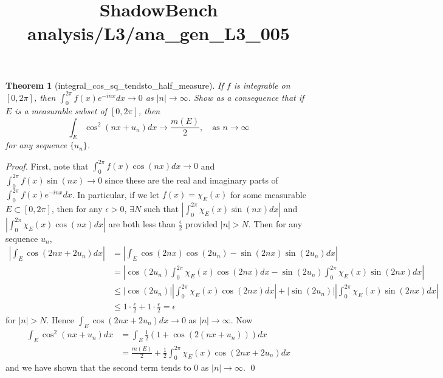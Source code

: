 \documentclass{article}
\title{ShadowBench analysis/L3/ana\_gen\_L3\_005}
\newtheorem{theorem}{Theorem}
\begin{document}
\maketitle

\begin{theorem}[integral_cos_sq_tendsto_half_measure]
If $f$ is integrable on $[0, 2\pi]$, then $\int_0^{2\pi} f(x) e^{-inx} dx \to 0$ as $|n| \to \infty$. Show as a consequence that if $E$ is a measurable subset of $[0, 2\pi]$, then
\[ \int_E \cos^2(nx + u_n) dx \to \frac{m(E)}{2}, \quad \text{as } n \to \infty \]
for any sequence $\{u_n\}$.
\end{theorem}

\begin{proof}
First, note that $\int_0^{2\pi} f(x) \cos(nx) dx \to 0$ and $\int_0^{2\pi} f(x) \sin(nx) \to 0$ since these are the real and imaginary parts of $\int_0^{2\pi} f(x) e^{-inx} dx$. In particular, if we let $f(x) = \chi_E(x)$ for some measurable $E \subset [0, 2\pi]$, then for any $\epsilon > 0$, $\exists N$ such that $\left| \int_0^{2\pi} \chi_E(x) \sin(nx) dx \right|$ and $\left| \int_0^{2\pi} \chi_E(x) \cos(nx) dx \right|$ are both less than $\frac{\epsilon}{2}$ provided $|n| > N$. Then for any sequence $u_n$,
\begin{align*}
\left| \int_E \cos(2nx + 2u_n) dx \right| &= \left| \int_E \cos(2nx) \cos(2u_n) - \sin(2nx) \sin(2u_n) dx \right| \\
&= \left| \cos(2u_n) \int_0^{2\pi} \chi_E(x) \cos(2nx) dx - \sin(2u_n) \int_0^{2\pi} \chi_E(x) \sin(2nx) dx \right| \\
&\le |\cos(2u_n)| \left| \int_0^{2\pi} \chi_E(x) \cos(2nx) dx \right| + |\sin(2u_n)| \left| \int_0^{2\pi} \chi_E(x) \sin(2nx) dx \right| \\
&\le 1 \cdot \frac{\epsilon}{2} + 1 \cdot \frac{\epsilon}{2} = \epsilon
\end{align*}
for $|n| > N$. Hence $\int_E \cos(2nx + 2u_n) dx \to 0$ as $|n| \to \infty$. Now
\begin{align*}
\int_E \cos^2(nx + u_n) dx &= \int_E \frac{1}{2} (1 + \cos(2(nx + u_n))) dx \\
&= \frac{m(E)}{2} + \frac{1}{2} \int_0^{2\pi} \chi_E(x) \cos(2nx + 2u_n) dx
\end{align*}
and we have shown that the second term tends to $0$ as $|n| \to \infty$. \qed
\end{proof}
\end{document}
